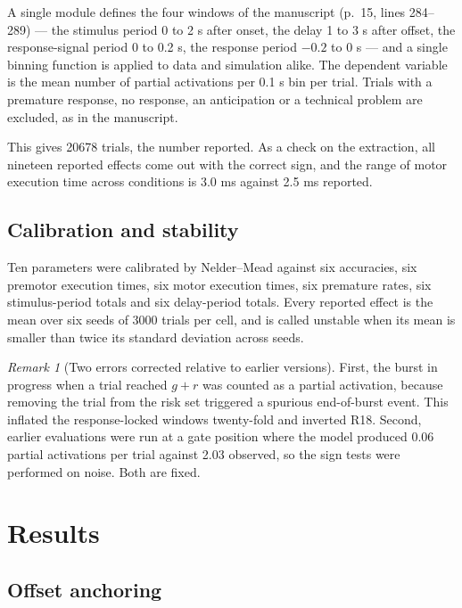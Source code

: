 \documentclass[11pt,a4paper]{article}
\theoremstyle{plain}
\theoremstyle{remark}
\newtheorem{remark}{Remark}
\begin{document}
A single module defines the four windows of the manuscript (p.~15, lines 284--289) --- the
stimulus period 0 to 2 s after onset, the delay 1 to 3 s after offset, the response-signal
period 0 to 0.2 s, the response period $-0.2$ to 0 s --- and a single binning function is
applied to data and simulation alike. The dependent variable is the mean number of partial
activations per 0.1 s bin per trial. Trials with a premature response, no response, an
anticipation or a technical problem are excluded, as in the manuscript.

This gives 20678 trials, the number reported. As a check on the extraction, all nineteen
reported effects come out with the correct sign, and the range of motor execution time
across conditions is 3.0 ms against 2.5 ms reported.

\subsection{Calibration and stability}

Ten parameters were calibrated by Nelder--Mead against six accuracies, six premotor
execution times, six motor execution times, six premature rates, six stimulus-period totals
and six delay-period totals. Every reported effect is the mean over six seeds of 3000 trials
per cell, and is called unstable when its mean is smaller than twice its standard deviation
across seeds.

\begin{remark}[Two errors corrected relative to earlier versions]
First, the burst in progress when a trial reached $g+r$ was counted as a partial activation,
because removing the trial from the risk set triggered a spurious end-of-burst event. This
inflated the response-locked windows twenty-fold and inverted R18. Second, earlier
evaluations were run at a gate position where the model produced 0.06 partial activations
per trial against 2.03 observed, so the sign tests were performed on noise. Both are fixed.
\end{remark}

\section{Results}
\label{sec:simres}

\subsection{Offset anchoring}
\end{document}
